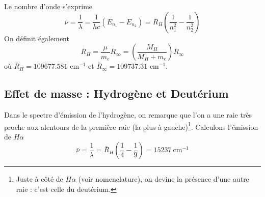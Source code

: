 Le nombre d'onde s'exprime
\begin{equation}
\bar \nu = \frac{1}{\lambda} = \frac{1}{hc}(E_{n_1}-E_{n_2}) = \bar R_H\left(\frac{1}{n^2_1}-\frac{1}{n^2_2}
\right)
\end{equation}
On définit également
\begin{equation}
\bar{R}_H = \frac{\mu}{m_e}\bar{R}_\infty = \left(\frac{M_H}{M_H+m_e}\right)\bar{R}_\infty
\end{equation}
où $\bar{R}_H = 109677.581$ cm$^{-1}$ et $\bar{R}_\infty = 109737.31$ cm$^{-1}$.



\subsection{Effet de masse : Hydrogène et Deutérium}
Dans le spectre d'émission de l'hydrogène, on remarque que l'on a une raie très proche aux alentours de la
première raie (la plus à gauche)\footnote{Juste à côté de $H\alpha$ (voir nomenclature), on devine la présence
d'une autre raie : c'est celle du deutérium.}. Calculons l'émission de $H\alpha$
\begin{equation}
\bar\nu = \frac{1}{\lambda}= \bar{R}_H\left(\frac{1}{4}-\frac{1}{9}\right) = 15237\ \text{cm}^{-1}
\end{equation}


